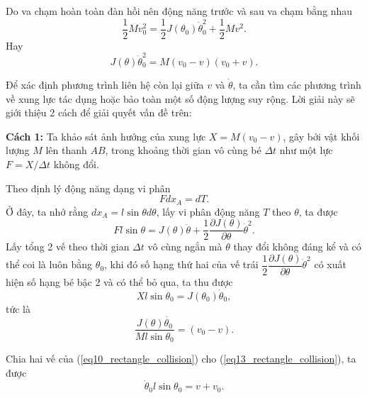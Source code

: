 \begin{enumerate}
Do va chạm hoàn toàn đàn hồi nên động năng trước và sau va chạm bằng nhau
\begin{equation} \label{eq9_rectangle_collision}
    \dfrac{1}{2} M v_0^2 = \dfrac{1}{2} J(\theta_0) \dot{\theta}_0^2 + \dfrac{1}{2} M v^2.
\end{equation}
Hay
\begin{equation} \label{eq10_rectangle_collision}
    J(\theta) \dot{\theta}_0^2 = M(v_0-v)(v_0+v).
\end{equation}

Để xác định phương trình liên hệ còn lại giữa $v$ và $\dot{\theta}$, ta cần tìm các phương trình về xung lực tác dụng hoặc bảo toàn một số động lượng suy rộng. Lời giải này sẽ giới thiệu 2 cách để giải quyết vấn đề trên:

\textbf{Cách 1:} Ta khảo sát ảnh hưởng của xung lực $X=M(v_0-v)$, gây bởi vật khối lượng $M$ lên thanh $AB$, trong khoảng thời gian vô cùng bé $\Delta t$ như một lực $F=X/\Delta t$ không đổi.

Theo định lý động năng dạng vi phân
\begin{equation} \label{eq11_rectangle_collision}
    F dx_A = dT.
\end{equation}
Ở đây, ta nhớ rằng $dx_A=l \sin \theta d \theta$, lấy vi phân động năng $T$ theo $\theta$, ta được
\begin{equation} \label{eq12_rectangle_collision}
    F l \sin \theta = J(\theta) \ddot{\theta} + \dfrac{1}{2} \dfrac{\partial J(\theta)}{\partial \theta} \dot{\theta}^2.
\end{equation}
Lấy tổng 2 vế theo thời gian $\Delta t$ vô cùng ngắn mà $\theta$ thay đổi không đáng kể và có thể coi là luôn bằng $\theta_0$, khi đó số hạng thứ hai của vế trái $\dfrac{1}{2} \dfrac{\partial J(\theta)}{\partial \theta} \dot{\theta}^2$ có xuất hiện số hạng bé bậc 2 và có thể bỏ qua, ta thu được
\begin{equation*}
    X l \sin \theta_0 = J(\theta_0) \dot{\theta}_0,
\end{equation*}
tức là
\begin{equation} \label{eq13_rectangle_collision}
    \dfrac{J(\theta) \dot{\theta_0}}{M l \sin \theta_0} = (v_0-v).
\end{equation}

Chia hai vế của (\ref{eq10_rectangle_collision}) cho (\ref{eq13_rectangle_collision}), ta được
\begin{equation} \label{eq14_rectangle_collision}
    \dot{\theta}_0 l \sin \theta_0 = v + v_0.
\end{equation}


\end{enumerate}
